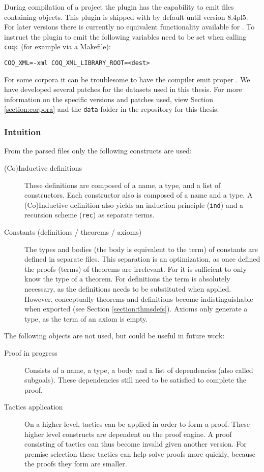 During compilation of a \coq project the \xml plugin has the capability to emit \xml files containing \acic objects.
This plugin is shipped with \coq by default until version 8.4pl5.
For later versions there is currently no equivalent functionality available for \coq.
To instruct the plugin to emit \xml the following variables need to be set when calling \texttt{coqc} (for example via a Makefile):
\begin{center}
	\lstinline{COQ_XML=-xml COQ_XML_LIBRARY_ROOT=<dest>}
\end{center}

For some corpora it can be troublesome to have the compiler emit proper \xml.
We have developed several patches for the datasets used in this thesis.
For more information on the specific versions and patches used,
view Section \ref{section:corpora} and the \texttt{data} folder in the repository for this thesis.

\subsubsection{Intuition}
From the parsed \xml files only the following \acic constructs are used:
\begin{description}
    \item[(Co)Inductive definitions]
        These definitions are composed of a name, a type, and a list of constructors.
        Each constructor also is composed of a name and a type.
		A (Co)Inductive definition also yields an induction principle (\texttt{ind}) and a recursion scheme (\texttt{rec}) as separate terms.
    \item[Constants (definitions / theorems / axioms)]
		The types and bodies (the body is equivalent to the \acic term) of constants are defined in separate \xml files.
		This separation is an optimization, as once defined the proofs (terms) of theorems are irrelevant.
		For \coq it is sufficient to only know the type of a theorem.
		For definitions the term is absolutely necessary, as the definitions needs to be substituted when applied.
		However, conceptually theorems and definitions become indistinguishable when exported (see Section \ref{section:thmsdefs}).
        Axioms only generate a type, as the term of an axiom is empty.
\end{description}

The following objects are not used, but could be useful in future work:
\begin{description}
    \item[Proof in progress]
		Consists of a name, a type, a body and a list of dependencies (also called subgoals).
        These dependencies still need to be satisfied to complete the proof.
    \item[Tactics application]
        On a higher level, tactics can be applied in order to form a proof.
        These higher level constructs are dependent on the proof engine.
        A proof consisting of tactics can thus become invalid given another \coq version.
        For premise selection these tactics can help solve proofs more quickly, because the proofs they form are smaller.
\end{description}

